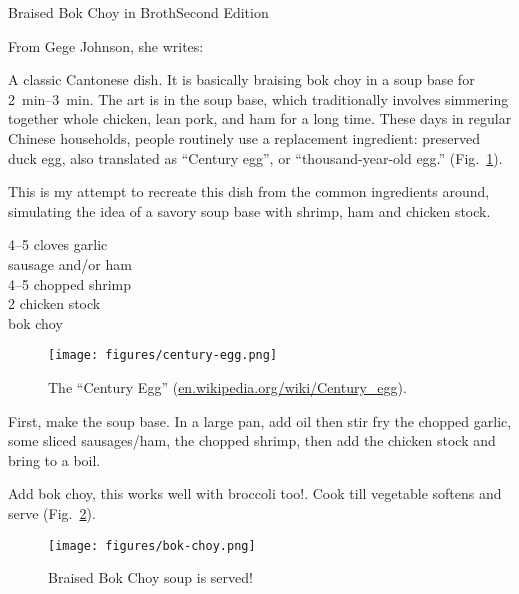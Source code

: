 \begin{entry}{Braised Bok Choy in Broth}{Second Edition}

\begin{open}
    From Gege Johnson, she writes:

    A classic Cantonese dish. It is basically braising bok choy in a soup base
    for \SIrange{2}{3}{\minute}. The art is in the soup base, which
    traditionally involves simmering together whole chicken, lean pork, and ham
    for a long time. These days in regular Chinese households, people routinely
    use a replacement ingredient: preserved duck egg, also translated as
    ``Century egg'', or ``thousand-year-old egg.'' (Fig.~\ref{fig:century-egg}).

    This is my attempt to recreate this dish from the common ingredients around,
    simulating the idea of a savory soup base with shrimp, ham and chicken
    stock.
\end{open}
\begin{ingredients}
    \numrange{4}{5} cloves garlic\\
    sausage and/or ham\\
    \numrange{4}{5} chopped shrimp\\
    \SI{2}{\cup} chicken stock\\
    bok choy
\end{ingredients}
\begin{figure}[b]
    \centering
    \texttt{[image: figures/century-egg.png]}
    \caption{The ``Century Egg'' (\url{en.wikipedia.org/wiki/Century_egg}).}
    \label{fig:century-egg}
\end{figure}
First, make the soup base.  In a large pan, add oil then stir fry the chopped
garlic, some sliced sausages/ham, the chopped shrimp, then add the chicken stock
and bring to a boil.

Add bok choy, this works well with broccoli too!.  Cook till vegetable softens
and serve (Fig.~\ref{fig:bok-choy}).
\begin{figure}
    \centering
    \texttt{[image: figures/bok-choy.png]}
    \caption{Braised Bok Choy soup is served!}
    \label{fig:bok-choy}
\end{figure}
\end{entry}